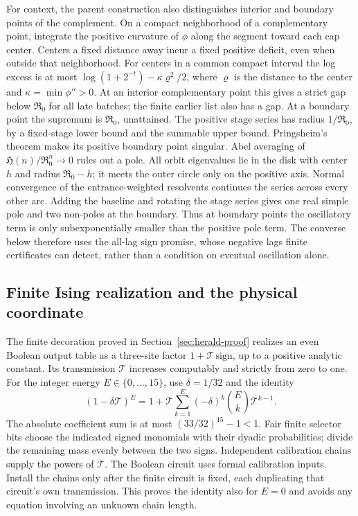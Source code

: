 For context, the parent construction also distinguishes interior and boundary points of the complement. On a compact neighborhood of a complementary point, integrate the positive curvature of \(\phi\) along the segment toward each cap center. Centers a fixed distance away incur a fixed positive deficit, even when outside that neighborhood. For centers in a common compact interval the log excess is at most \(\log(1+2^{-t})-\kappa\varrho^2/2\), where \(\varrho\) is the distance to the center and \(\kappa=\min\phi''>0\). At an interior complementary point this gives a strict gap below \(\mathfrak R_0\) for all late batches; the finite earlier list also has a gap. At a boundary point the supremum is \(\mathfrak R_0\), unattained. The positive stage series has radius \(1/\mathfrak R_0\), by a fixed-stage lower bound and the summable upper bound. Pringsheim's theorem \cite[Theorem~IV.6]{flajoletSedgewick} makes its positive boundary point singular. Abel averaging of \(\mathfrak H(n)/\mathfrak R_0^n\to0\) rules out a pole. All orbit eigenvalues lie in the disk with center \(h\) and radius \(\mathfrak R_0-h\); it meets the outer circle only on the positive axis. Normal convergence of the entrance-weighted resolvents continues the series across every other arc. Adding the baseline and rotating the stage series gives one real simple pole and two non-poles at the boundary. Thus at boundary points the oscillatory term is only subexponentially smaller than the positive pole term. The converse below therefore uses the all-lag sign promise, whose negative lags finite certificates can detect, rather than a condition on eventual oscillation alone.

\subsection{Finite Ising realization and the physical coordinate}\label{sec:ising-fixedpoint}

The finite decoration proved in Section~\ref{sec:herald-proof} realizes an even Boolean output table as a three-site factor \(1+\mathcal T\,\mathrm{sign}\), up to a positive analytic constant. Its transmission \(\mathcal T\) increases computably and strictly from zero to one. For the integer energy \(E\in\{0,\ldots,15\}\), use \(\delta=1/32\) and the identity
\begin{equation}\label{eq:general-selector}
 (1-\delta\mathcal T)^E
 =1+\mathcal T\sum_{k=1}^E(-\delta)^k\binom Ek\mathcal T^{k-1}.
\end{equation}
The absolute coefficient sum is at most \((33/32)^{15}-1<1\). Fair finite selector bits choose the indicated signed monomials with their dyadic probabilities; divide the remaining mass evenly between the two signs. Independent calibration chains supply the powers of \(\mathcal T\). The Boolean circuit uses formal calibration inputs. Install the chains only after the finite circuit is fixed, each duplicating that circuit's own transmission. This proves the identity also for \(E=0\) and avoids any equation involving an unknown chain length.

